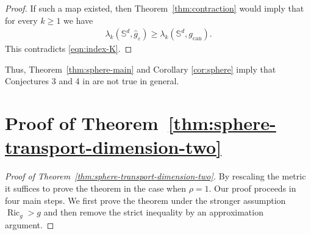 \documentclass[11pt,reqno]{amsart}
\numberwithin{equation}{section}
\theoremstyle{definition}
\theoremstyle{remark}
\newcommand{\lam}{\lambda}
\newcommand{\0}{\emptyset}
\newcommand{\veps}{\varepsilon}
\newcommand{\bbS}{\mathbb S}
\newcommand{\Ric}{\operatorname{Ric}}
\newcommand{\can}{\mathrm{can}}
\begin{document}
\begin{proof}
If such a map existed, then Theorem~\ref{thm:contraction} would imply that for every $k\geq1$ we have
\begin{align}
        \lam_k(\bbS^d,\widehat g_\veps)
        \geq
        \lam_k(\bbS^d,g_\can).
\end{align}
This contradicts \eqref{eqn:index-K}.
\end{proof}
Thus, Theorem~\ref{thm:sphere-main} and Corollary \ref{cor:sphere} imply that Conjectures 3 and 4 in \cite{milman2018spectral} are not true in general.
\section{Proof of Theorem~\ref{thm:sphere-transport-dimension-two}}
\begin{proof}[Proof of Theorem~\ref{thm:sphere-transport-dimension-two}]
By rescaling the metric it suffices to prove the theorem in the case when $\rho=1$. Our proof proceeds in four main steps. We first prove the theorem under the stronger assumption $\Ric_g>g$ and then remove the strict inequality by an approximation argument.

\end{proof}
\end{document}
